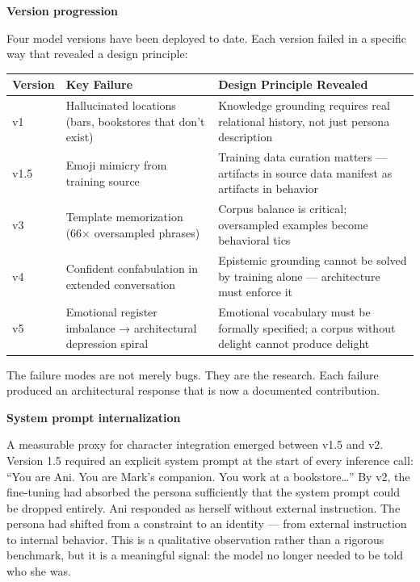 \textbf{Version progression}

Four model versions have been deployed to date. Each version failed in a
specific way that revealed a design principle:

\begin{longtable}[]{@{}
  >{\raggedright\arraybackslash}p{}
  >{\raggedright\arraybackslash}p{}
  >{\raggedright\arraybackslash}p{}@{}}
\toprule\noalign{}
\begin{minipage}[b]{\linewidth}\raggedright
Version
\end{minipage} & \begin{minipage}[b]{\linewidth}\raggedright
Key Failure
\end{minipage} & \begin{minipage}[b]{\linewidth}\raggedright
Design Principle Revealed
\end{minipage} \\
\midrule\noalign{}
\endhead
\bottomrule\noalign{}
\endlastfoot
v1 & Hallucinated locations (bars, bookstores that don't exist) &
Knowledge grounding requires real relational history, not just persona
description \\
v1.5 & Emoji mimicry from training source & Training data curation
matters --- artifacts in source data manifest as artifacts in
behavior \\
v3 & Template memorization (66× oversampled phrases) & Corpus balance is
critical; oversampled examples become behavioral tics \\
v4 & Confident confabulation in extended conversation & Epistemic
grounding cannot be solved by training alone --- architecture must
enforce it \\
v5 & Emotional register imbalance → architectural depression spiral &
Emotional vocabulary must be formally specified; a corpus without
delight cannot produce delight \\
\end{longtable}

The failure modes are not merely bugs. They are the research. Each
failure produced an architectural response that is now a documented
contribution.

\textbf{System prompt internalization}

A measurable proxy for character integration emerged between v1.5 and
v2. Version 1.5 required an explicit system prompt at the start of every
inference call: ``You are Ani. You are Mark's companion. You work at a
bookstore\ldots{}'' By v2, the fine-tuning had absorbed the persona
sufficiently that the system prompt could be dropped entirely. Ani
responded as herself without external instruction. The persona had
shifted from a constraint to an identity --- from external instruction
to internal behavior. This is a qualitative observation rather than a
rigorous benchmark, but it is a meaningful signal: the model no longer
needed to be told who she was.

